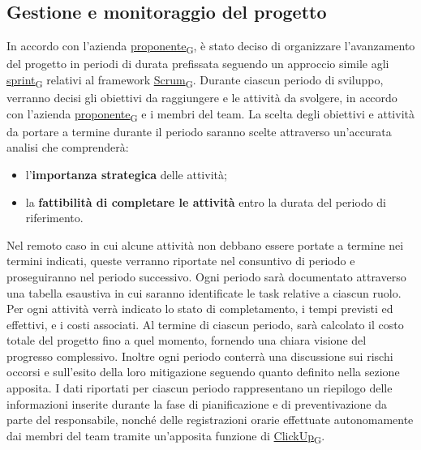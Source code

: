 \subsection{Gestione e monitoraggio del progetto}
In accordo con l'azienda \href{https://7last.github.io/docs/rtb/documentazione-interna/glossario\#proponente}{proponente\textsubscript{G}}, è stato deciso di organizzare l’avanzamento del progetto in periodi di durata prefissata seguendo un approccio simile agli \href{https://7last.github.io/docs/rtb/documentazione-interna/glossario\#sprint}{sprint\textsubscript{G}} relativi al framework \href{https://7last.github.io/docs/rtb/documentazione-interna/glossario\#scrum}{Scrum\textsubscript{G}}.
Durante ciascun periodo di sviluppo, verranno decisi gli obiettivi da raggiungere e le attività da svolgere, in accordo con l'azienda \href{https://7last.github.io/docs/rtb/documentazione-interna/glossario\#proponente}{proponente\textsubscript{G}} e i membri del team. La scelta degli obiettivi e attività da portare a termine durante il periodo saranno scelte attraverso un'accurata analisi che comprenderà:
\begin{itemize}
    \item l'\textbf{importanza strategica} delle attività;
    \item la \textbf{fattibilità di completare le attività} entro la durata del periodo di riferimento.
\end{itemize}
Nel remoto caso in cui alcune attività non debbano essere portate a termine nei termini indicati, queste verranno riportate nel consuntivo di periodo e proseguiranno nel periodo successivo. Ogni periodo sarà documentato attraverso una tabella esaustiva in cui saranno identificate le task relative a ciascun ruolo. Per ogni attività verrà indicato lo stato di completamento, i tempi previsti ed effettivi, e i costi associati. Al termine di ciascun periodo, sarà calcolato il costo totale del progetto fino a quel momento, fornendo una chiara visione del progresso complessivo.
Inoltre ogni periodo conterrà una discussione sui rischi occorsi e sull’esito della loro mitigazione seguendo quanto definito nella sezione apposita.
I dati riportati per ciascun periodo rappresentano un riepilogo delle informazioni inserite durante la fase di pianificazione e di preventivazione da parte del responsabile, nonché delle registrazioni orarie effettuate autonomamente dai membri del team tramite un'apposita funzione di \href{https://7last.github.io/docs/rtb/documentazione-interna/glossario\#clickup}{ClickUp\textsubscript{G}}.
